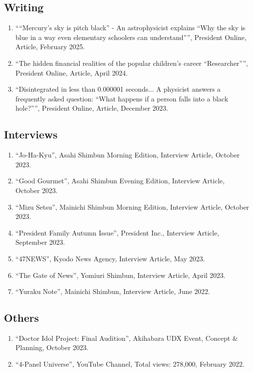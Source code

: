 \documentclass[uplatex, 12pt]{article}
\begin{document}
\subsection*{Writing}
\begin{enumerate}
\item ““Mercury’s sky is pitch black” - An astrophysicist explains “Why the sky is blue in a way even elementary schoolers can understand””, President Online, Article, February 2025.
\item “The hidden financial realities of the popular children's career “Researcher””, President Online, Article, April 2024.
\item “Disintegrated in less than 0.000001 seconds... A physicist answers a frequently asked question: “What happens if a person falls into a black hole?””, President Online, Article, December 2023.
\end{enumerate}
\subsection*{Interviews}
\begin{enumerate}
\item “Jo-Ha-Kyu”, Asahi Shimbun Morning Edition, Interview Article, October 2023.
\item “Good Gourmet”, Asahi Shimbun Evening Edition, Interview Article, October 2023.
\item “Mizu Setsu”, Mainichi Shimbun Morning Edition, Interview Article, October 2023.
\item “President Family Autumn Issue”, President Inc., Interview Article, September 2023.
\item “47NEWS”, Kyodo News Agency, Interview Article, May 2023.
\item “The Gate of News”, Yomiuri Shimbun, Interview Article, April 2023.
\item “Yuraku Note”, Mainichi Shimbun, Interview Article, June 2022.
\end{enumerate}
\subsection*{Others}
\begin{enumerate}
\item “Doctor Idol Project: Final Audition”, Akihabara UDX Event, Concept \& Planning, October 2023.
\item “4-Panel Universe”, YouTube Channel, Total views: 278,000, February 2022.
\end{enumerate}

\end{document}
